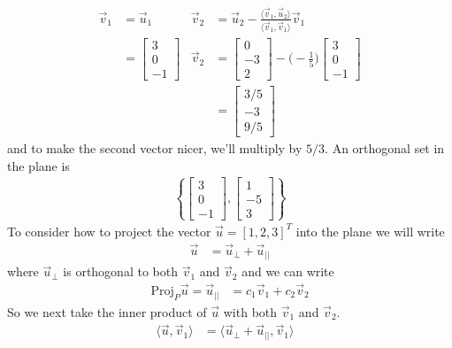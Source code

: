 \begin{example}
\begin{align*}
 \vec{v}_1 & = \vec{u}_1 
& \vec{v}_2 &= \vec{u}_2 - \frac{\langle \vec{v}_1,\vec{u}_2 \rangle}{\langle \vec{v}_1, \vec{v}_1 \rangle} \vec{v}_1  \\
 & = \begin{bmatrix}
 3 \\ 0 \\ -1
 \end{bmatrix}&
 \vec{v}_2 & = \begin{bmatrix}
 0 \\ -3 \\ 2
\end{bmatrix} - \biggl(-\frac{1}{5}\biggr) 
\begin{bmatrix}
 3 \\ 0 \\ -1 
\end{bmatrix} \\
&&&  = 
\begin{bmatrix}
 3/5 \\ -3 \\ 9/5 
\end{bmatrix}
\end{align*}
and to make the second vector nicer, we'll multiply by $5/3$.  An orthogonal set in the plane is
%
\begin{align*}
\left\{ \begin{bmatrix}
3 \\ 0 \\ -1
\end{bmatrix} , \begin{bmatrix}
1 \\ -5 \\ 3 
\end{bmatrix} \right \}
\end{align*}
To consider how to project the vector $\vec{u} = [1,2,3]^T$ into the plane we will write
\begin{align*}
\vec{u} & = \vec{u}_{\perp} + \vec{u}_{||}
\end{align*}
where $\vec{u}_{\perp}$ is orthogonal to both $\vec{v}_1$ and $\vec{v}_2$ and we can write
%
\begin{align*}
\text{Proj}_{P}\vec{u} = \vec{u}_{||} & = c_1 \vec{v}_1 + c_2 \vec{v}_2 
\end{align*}
So we next take the inner product of $\vec{u}$ with both $\vec{v}_1$ and $\vec{v}_2$. 
\begin{align*}
\langle \vec{u}, \vec{v}_1 \rangle & = \langle \vec{u}_{\perp} + \vec{u}_{||}, \vec{v}_1 \rangle &

\end{align*}
\end{example}

